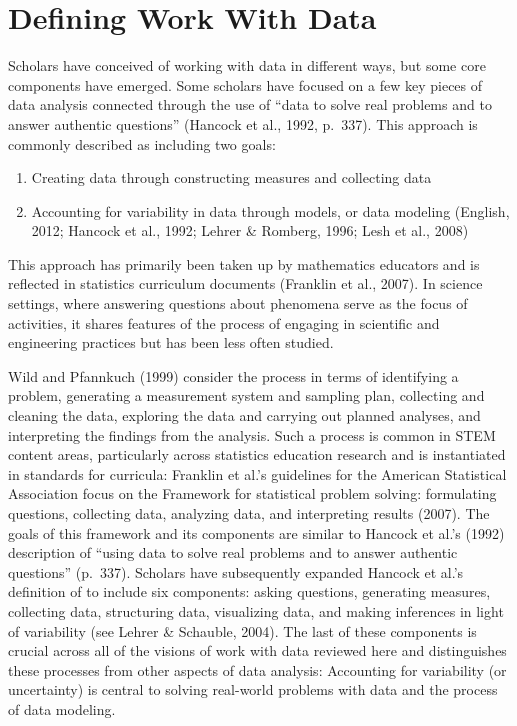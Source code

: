 \documentclass[]{book}
\providecommand{\tightlist}{%
  \setlength{\itemsep}{0pt}\setlength{\parskip}{0pt}}
\theoremstyle{definition}
\theoremstyle{definition}
\theoremstyle{definition}
\theoremstyle{remark}
\begin{document}
\section{Defining Work With Data}\label{defining-work-with-data}

Scholars have conceived of working with data in different ways, but some
core components have emerged. Some scholars have focused on a few key
pieces of data analysis connected through the use of ``data to solve
real problems and to answer authentic questions'' (Hancock et al., 1992,
p.~337). This approach is commonly described as including two goals:

\begin{enumerate}
\def\labelenumi{\arabic{enumi}.}
\tightlist
\item
  Creating data through constructing measures and collecting data
\item
  Accounting for variability in data through models, or data modeling
  (English, 2012; Hancock et al., 1992; Lehrer \& Romberg, 1996; Lesh et
  al., 2008)
\end{enumerate}

This approach has primarily been taken up by mathematics educators and
is reflected in statistics curriculum documents (Franklin et al., 2007).
In science settings, where answering questions about phenomena serve as
the focus of activities, it shares features of the process of engaging
in scientific and engineering practices but has been less often studied.

Wild and Pfannkuch (1999) consider the process in terms of identifying a
problem, generating a measurement system and sampling plan, collecting
and cleaning the data, exploring the data and carrying out planned
analyses, and interpreting the findings from the analysis. Such a
process is common in STEM content areas, particularly across statistics
education research and is instantiated in standards for curricula:
Franklin et al.'s guidelines for the American Statistical Association
focus on the Framework for statistical problem solving: formulating
questions, collecting data, analyzing data, and interpreting results
(2007). The goals of this framework and its components are similar to
Hancock et al.'s (1992) description of ``using data to solve real
problems and to answer authentic questions'' (p.~337). Scholars have
subsequently expanded Hancock et al.'s definition of to include six
components: asking questions, generating measures, collecting data,
structuring data, visualizing data, and making inferences in light of
variability (see Lehrer \& Schauble, 2004). The last of these components
is crucial across all of the visions of work with data reviewed here and
distinguishes these processes from other aspects of data analysis:
Accounting for variability (or uncertainty) is central to solving
real-world problems with data and the process of data modeling.
\end{document}
